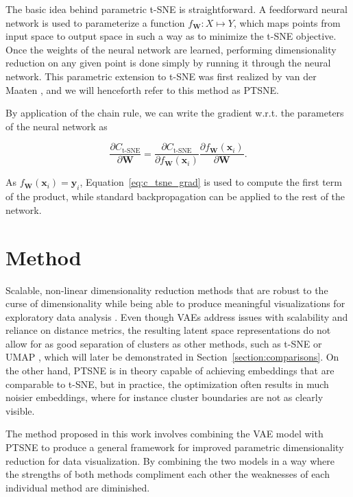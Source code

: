 The basic idea behind parametric t-SNE is straightforward. A feedforward neural network is used to parameterize a function $f_\mathbf{W}: X \mapsto Y$, which maps points from input space to output space in such a way as to minimize the t-SNE objective. Once the weights of the neural network are learned, performing dimensionality reduction on any given point is done simply by running it through the neural network. This parametric extension to t-SNE was first realized by van der Maaten \cite{parametric_tsne}, and we will henceforth refer to this method as PTSNE.

By application of the chain rule, we can write the gradient w.r.t. the parameters of the neural network as

$$\frac{\partial C_{\text{t-SNE}}}{\partial \mathbf{W}} = \frac{\partial C_{\text{t-SNE}}}{\partial f_{\mathbf{W}}(\mathbf{x}_i)} \frac{\partial f_{\mathbf{W}}(\mathbf{x}_i)}{\partial \mathbf{W}}.$$

As $f_{\mathbf{W}}(\mathbf{x}_i) = \mathbf{y}_i$, Equation~\ref{eq:c_tsne_grad} is used to compute the first term of the product, while standard backpropagation can be applied to the rest of the network.

\chapter{Method}
\label{ch:method}

Scalable, non-linear dimensionality reduction methods that are robust to the curse of dimensionality while being able to produce meaningful visualizations for exploratory data analysis . Even though VAEs address issues with scalability and reliance on distance metrics, the resulting latent space representations do not allow for as good separation of clusters as other methods, such as t-SNE or UMAP \cite{umap}, which will later be demonstrated in Section~\ref{section:comparisons}. On the other hand, PTSNE is in theory capable of achieving embeddings that are comparable to t-SNE, but in practice, the optimization often results in much noisier embeddings, where for instance cluster boundaries are not as clearly visible.

The method proposed in this work involves combining the VAE model with PTSNE to produce a general framework for improved parametric dimensionality reduction for data visualization. By combining the two models in a way where the strengths of both methods compliment each other the weaknesses of each individual method are diminished.

